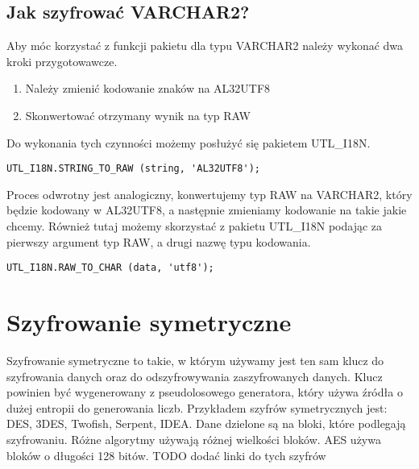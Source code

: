 \documentclass[12pt, a4paper]{article}
\begin{document}
\subsection{Jak szyfrować VARCHAR2?}

Aby móc korzystać z funkcji pakietu dla typu VARCHAR2 należy wykonać
dwa kroki przygotowawcze.
\begin{enumerate}
	\item Należy zmienić kodowanie znaków na AL32UTF8
	\item Skonwertować otrzymany wynik na typ RAW
\end{enumerate}
Do wykonania tych czynności możemy posłużyć się pakietem UTL\_I18N.
\begin{lstlisting}
UTL_I18N.STRING_TO_RAW (string, 'AL32UTF8');
\end{lstlisting}

Proces odwrotny jest analogiczny, konwertujemy typ RAW na VARCHAR2, który
będzie kodowany w AL32UTF8, a następnie zmieniamy kodowanie na takie
jakie chcemy. Również tutaj możemy skorzystać z pakietu UTL\_I18N
podając za pierwszy argument typ RAW, a drugi nazwę typu kodowania.

\begin{lstlisting}
UTL_I18N.RAW_TO_CHAR (data, 'utf8');
\end{lstlisting}

\section{Szyfrowanie symetryczne}
Szyfrowanie symetryczne to takie, w którym używamy jest ten sam klucz do
szyfrowania danych oraz do odszyfrowywania zaszyfrowanych danych. Klucz
powinien być wygenerowany z pseudolosowego generatora, który używa
źródła o dużej entropii do generowania liczb. Przykładem szyfrów
symetrycznych jest: DES, 3DES, Twofish, Serpent, IDEA. Dane dzielone są na
bloki, które podlegają szyfrowaniu. Różne algorytmy używają różnej
wielkości bloków. AES używa bloków o długości 128 bitów.
TODO dodać linki do tych szyfrów
\item[]  
\end{document}
